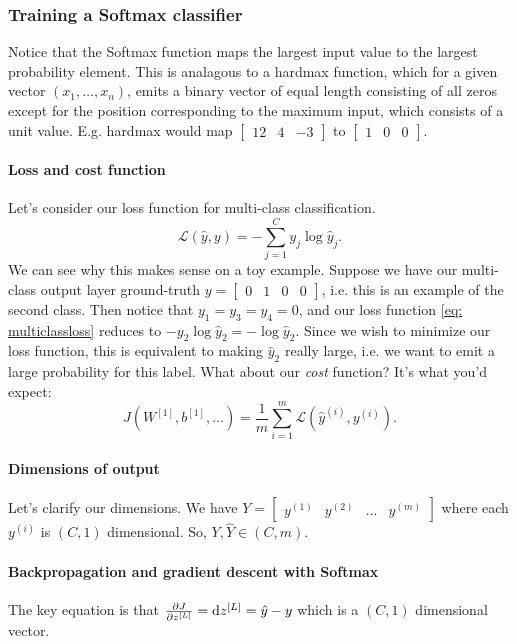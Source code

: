 \documentclass[12pt]{article}
\begin{document}
\subsubsection{Training a Softmax classifier} Notice that the Softmax function maps the largest input value to the largest probability element. This is analagous to a hardmax function, which for a given vector $(x_1, \ldots, x_n)$,
emits a binary vector of equal length consisting of all zeros except for the position corresponding to the maximum input, which consists of a unit value. E.g. hardmax would map $\begin{bmatrix}   12 & 4 & -3 \end{bmatrix}$ to $\begin{bmatrix}   1 & 0 & 0 \end{bmatrix}$.

\paragraph{Loss and cost function} Let's consider our loss function for multi-class classification.
\begin{equation}
\label{eq: multiclassloss}
\mathcal L (\hat y, y) = -\sum_{j=1}^C y_j \log \hat y_j.
\end{equation}
We can see why this makes sense on a toy example. Suppose we have our multi-class output layer ground-truth $y = \begin{bmatrix}
0 & 1 & 0 & 0 \end{bmatrix}$, i.e. this is an example of the second class. Then notice that $y_1 = y_3 = y_4 = 0$, and our 
loss function \ref{eq: multiclassloss} reduces to $-y_2 \log \hat y_2 = -\log \hat y_2$. Since we wish to minimize our
loss function, this is equivalent to making $\hat y_2$ really large, i.e. we want to emit a large probability for this
label. What about our \emph{cost} function? It's what you'd expect:
\[
J(W^{[1]}, b^{[1]}, \ldots) = \frac{1}{m} \sum_{i=1}^m \mathcal L(\hat y^{(i)}, y^{(i)}).
\]

\paragraph{Dimensions of output}
Let's clarify our dimensions. We have $Y = \begin{bmatrix}   y^{(1)} & y^{(2)} & \ldots & y^{(m)} \end{bmatrix}$ where each $y^{(i)}$ is $(C, 1)$ dimensional. So, $Y, \hat Y \in (C, m)$.

\paragraph{Backpropagation and gradient descent with Softmax} The key equation is that $\frac{\partial J}{\partial z^{[L]}} = \operatorname{d}\!{z}^{[L]} = \hat y - y$ which is a $(C, 1)$ dimensional vector.
\end{document}
